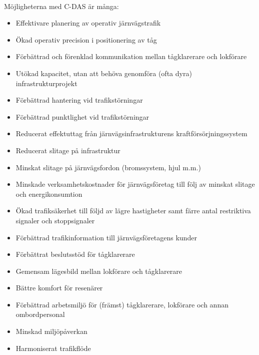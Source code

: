 \paragraph{}
Möjligheterna med C-DAS är många:
\begin{itemize}
    \item Effektivare planering av operativ järnvägstrafik~\cite{Joborn2023}
    \item Ökad operativ precision i positionering av tåg~\cite{Systemdefinition2019}
    \item Förbättrad och förenklad kommunikation mellan tågklarerare och lokförare~\cite{Systemdefinition2019}
    \item Utökad kapacitet, utan att behöva genomföra (ofta dyra) infrastrukturprojekt~\cite{Ketech2022, Lindmark2022, Olsson2023, Verstappen2022}
    \item Förbättrad hantering vid trafikstörningar~\cite{Angel2020, Joborn2023, Lindmark2022, Systemdefinition2019, Ketech2022, Verstappen2022}
    \item Förbättrad punktlighet vid trafikstörningar~\cite{Angel2020, Joborn2023, Lindmark2022, Systemdefinition2019, Ketech2022, Verstappen2022}
    \item Reducerat effektuttag från järnvägsinfrastrukturens kraftförsörjningssystem~\cite{Angel2020, Joborn2023, Lindmark2022, Systemdefinition2019, Ketech2022, Olsson2023, Verstappen2022}
    \item Reducerat slitage på infrastruktur~\cite{Angel2020, Joborn2023, Lindmark2022, Systemdefinition2019, Ketech2022, Olsson2023}
    \item Minskat slitage på järnvägsfordon (bromssystem, hjul m.m.)~\cite{Angel2020, Joborn2023, Systemdefinition2019, Ketech2022, Lindmark2022, Olsson2023}
    \item Minskade verksamhetskostnader för järnvägsföretag till följ av minskat slitage och energikonsumtion~\cite{Ketech2022}
    \item Ökad trafiksäkerhet till följd av lägre hastigheter samt färre antal restriktiva signaler och stoppsignaler ~\cite{Olsson2023}
    \item Förbättrad trafikinformation till järnvägsföretagens kunder~\cite{Angel2020, Ketech2022, Lindmark2022}
    \item Förbättrat beslutsstöd för tågklarerare~\cite{Lindmark2022, Ketech2022}
    \item Gemensam lägesbild mellan lokförare och tågklarerare~\cite{Lindmark2022, Ketech2022}
    \item Bättre komfort för resenärer~\cite{Lindmark2022, Systemdefinition2019}
    \item Förbättrad arbetsmiljö för (främst) tågklarerare, lokförare och annan ombordpersonal~\cite{Systemdefinition2019}
    \item Minskad miljöpåverkan~\cite{Lindmark2022}
    \item Harmoniserat trafikflöde~\cite{Systemdefinition2019}
\end{itemize}
